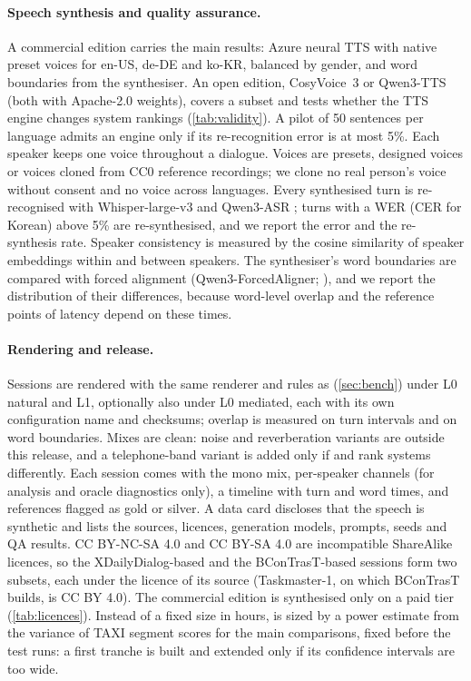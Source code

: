 \paragraph{Speech synthesis and quality assurance.}
A commercial edition carries the main results: Azure neural TTS \citep{microsoft2026text} with native preset voices for en-US, de-DE and ko-KR, balanced by gender, and word boundaries from the synthesiser. An open edition, CosyVoice~3 \citep{du2025cosyvoice3} or Qwen3-TTS \citep{hu2026qwen3tts} (both with Apache-2.0 weights), covers a subset and tests whether the TTS engine changes system rankings (\cref{tab:validity}). A pilot of 50 sentences per language admits an engine only if its re-recognition error is at most 5\%. Each speaker keeps one voice throughout a dialogue. Voices are presets, designed voices or voices cloned from CC0 reference recordings; we clone no real person's voice without consent and no voice across languages. Every synthesised turn is re-recognised with Whisper-large-v3 \citep{radford2023robust} and Qwen3-ASR \citep{shi2026qwen3asr}; turns with a WER (CER for Korean) above 5\% are re-synthesised, and we report the error and the re-synthesis rate. Speaker consistency is measured by the cosine similarity of speaker embeddings within and between speakers. The synthesiser's word boundaries are compared with forced alignment (Qwen3-ForcedAligner; \citealp{shi2026qwen3asr}), and we report the distribution of their differences, because word-level overlap and the reference points of latency depend on these times.

\paragraph{Rendering and release.}
Sessions are rendered with the same renderer and rules as \taxi (\cref{sec:bench}) under L0 natural and L1, optionally also under L0 mediated, each with its own configuration name and checksums; overlap is measured on turn intervals and on word boundaries. Mixes are clean: noise and reverberation variants are outside this release, and a telephone-band variant is added only if \syn and \taxi rank systems differently. Each session comes with the mono mix, per-speaker channels (for analysis and oracle diagnostics only), a timeline with turn and word times, and references flagged as gold or silver. A data card discloses that the speech is synthetic and lists the sources, licences, generation models, prompts, seeds and QA results. CC BY-NC-SA 4.0 and CC BY-SA 4.0 are incompatible ShareAlike licences, so the XDailyDialog-based and the BConTrasT-based sessions form two subsets, each under the licence of its source (Taskmaster-1, on which BConTrasT builds, is CC BY 4.0). The commercial edition is synthesised only on a paid tier (\cref{tab:licences}). Instead of a fixed size in hours, \syn is sized by a power estimate from the variance of TAXI segment scores for the main comparisons, fixed before the test runs: a first tranche is built and extended only if its confidence intervals are too wide.

